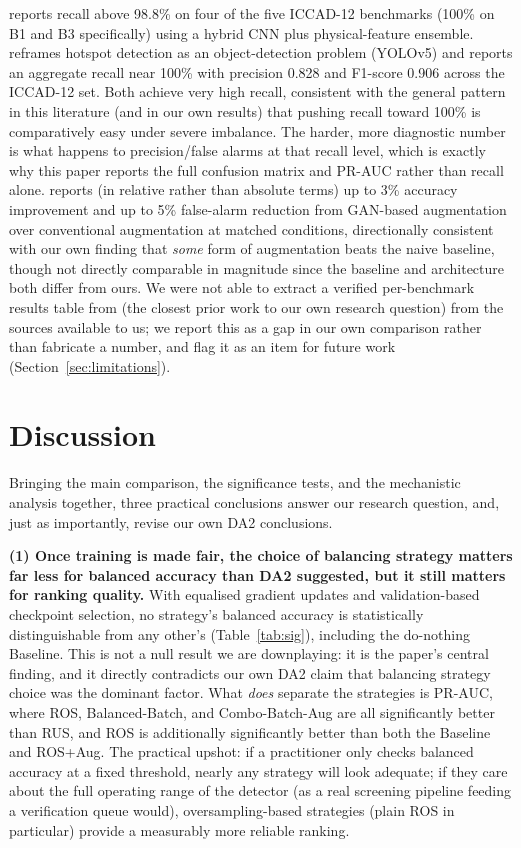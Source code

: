 \documentclass[conference]{IEEEtran}
\begin{document}
\cite{huang2021enhancements} reports recall above 98.8\% on four of
the five ICCAD-12 benchmarks (100\% on B1 and B3 specifically) using a
hybrid CNN plus physical-feature ensemble. \cite{lin2025yolov5}
reframes hotspot detection as an object-detection problem (YOLOv5) and
reports an aggregate recall near 100\% with precision 0.828 and
F1-score 0.906 across the ICCAD-12 set. Both achieve very high recall,
consistent with the general pattern in this literature (and in our own
results) that pushing recall toward 100\% is comparatively easy under
severe imbalance. The harder, more diagnostic number is what happens
to precision/false alarms at that recall level, which is exactly why
this paper reports the full confusion matrix and PR-AUC rather than
recall alone. \cite{wang2021gan} reports (in relative rather than
absolute terms) up to 3\% accuracy improvement and up to 5\% false-alarm
reduction from GAN-based augmentation over conventional augmentation
at matched conditions, directionally consistent with our own finding
that \emph{some} form of augmentation beats the naive baseline, though
not directly comparable in magnitude since the baseline and
architecture both differ from ours. We were not able to extract a
verified per-benchmark results table from \cite{yang2017imbalance} (the
closest prior work to our own research question) from the sources
available to us; we report this as a gap in our own comparison rather
than fabricate a number, and flag it as an item for future work
(Section~\ref{sec:limitations}).

\section{Discussion}
Bringing the main comparison, the significance tests, and the
mechanistic analysis together, three practical conclusions answer our
research question, and, just as importantly, revise our own DA2
conclusions.

\textbf{(1) Once training is made fair, the choice of balancing
strategy matters far less for balanced accuracy than DA2 suggested,
but it still matters for ranking quality.} With equalised gradient
updates and validation-based checkpoint selection, no strategy's
balanced accuracy is statistically distinguishable from any other's
(Table~\ref{tab:sig}), including the do-nothing Baseline. This is not
a null result we are downplaying: it is the paper's central finding,
and it directly contradicts our own DA2 claim that balancing strategy
choice was the dominant factor. What \emph{does} separate the
strategies is PR-AUC, where ROS, Balanced-Batch, and Combo-Batch-Aug
are all significantly better than RUS, and ROS is additionally
significantly better than both the Baseline and ROS+Aug. The practical
upshot: if a practitioner only checks balanced accuracy at a fixed
threshold, nearly any strategy will look adequate; if they care about
the full operating range of the detector (as a real screening pipeline
feeding a verification queue would), oversampling-based strategies
(plain ROS in particular) provide a measurably more reliable ranking.
\end{document}
